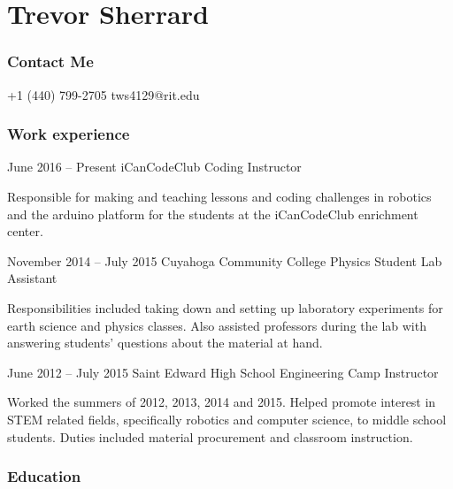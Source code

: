 \documentclass{tccv}
\begin{document}
\part{Trevor Sherrard}
\section{Contact Me}
\begin{eventlist}
    {+1 (440) 799-2705}
    {tws4129@rit.edu}
    
\end{eventlist}

\section{Work experience}

\begin{eventlist}

\item{June 2016 -- Present}
	 {iCanCodeClub}
	 {Coding Instructor}
	 
Responsible for making and teaching lessons and coding challenges in robotics and the arduino platform for the students at the iCanCodeClub enrichment center.

\item{November 2014 -- July 2015}
     {Cuyahoga Community College}
     {Physics Student Lab Assistant }

Responsibilities included taking down and setting up laboratory experiments for earth science and physics classes. Also assisted professors during the lab with answering students' questions about the material at hand.

\item{June 2012 -- July 2015}
     {Saint Edward High School}
     {Engineering Camp Instructor}
     
Worked the summers of 2012, 2013, 2014 and 2015. Helped promote interest in STEM related fields, specifically robotics and computer science, to middle school students. Duties included material procurement and classroom instruction.
\end{eventlist}

\section{Education}
\end{document}
